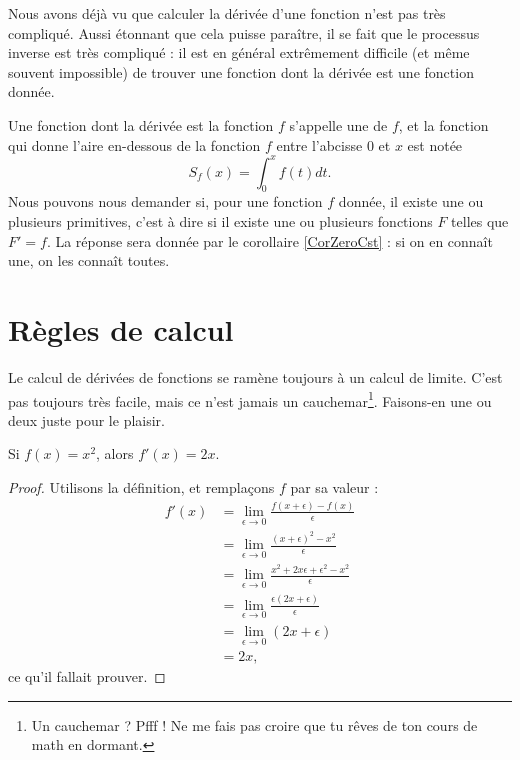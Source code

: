 \documentclass{article}
\begin{document}
Nous avons déjà vu que calculer la dérivée d'une fonction n'est pas très compliqué. Aussi étonnant que cela puisse paraître, il se fait que le processus inverse est très compliqué : il est en général extrêmement difficile (et même souvent impossible) de trouver une fonction dont la dérivée est une fonction donnée.

Une fonction dont la dérivée est la fonction $f$ s'appelle une  de $f$, et la fonction qui donne l'aire en-dessous de la fonction $f$ entre l'abcisse $0$ et $x$ est notée
\begin{equation}
	S_f(x)=\int_0^xf(t)dt.
\end{equation}
Nous pouvons nous demander si, pour une fonction $f$ donnée, il existe une ou plusieurs primitives, c'est à dire si il existe une ou plusieurs fonctions $F$ telles que $F'=f$. La réponse sera donnée par le corollaire \ref{CorZeroCst} : si on en connaît une, on les connaît toutes. 

					\section{Règles de calcul}

Le calcul de dérivées de fonctions se ramène toujours à un calcul de limite. C'est pas toujours très facile, mais ce n'est jamais un cauchemar\footnote{Un cauchemar ? Pfff ! Ne me fais pas croire que tu rêves de ton cours de math en dormant.}. Faisons-en une ou deux juste pour le plaisir.

\begin{lemma}			\label{LemDeccCarr}
	Si $f(x)=x^2$, alors $f'(x)=2x$.
\end{lemma}

\begin{proof}
	Utilisons la définition, et remplaçons $f$ par sa valeur :
	\begin{subequations}
		\begin{align}
			f'(x)	&=\lim_{\epsilon\to 0}\frac{ f(x+\epsilon)-f(x) }{ \epsilon }\\
				&=\lim_{\epsilon\to 0}\frac{ (x+\epsilon)^2-x^2 }{ \epsilon }\\
				&=\lim_{\epsilon\to 0}\frac{ x^2+2x\epsilon+\epsilon^2-x^2 }{ \epsilon }\\
				&=\lim_{\epsilon\to 0}\frac{\epsilon(2x+\epsilon)}{ \epsilon }\\
				&=\lim_{\epsilon\to 0}(2x+\epsilon)\\
				&=2x,
		\end{align}
	\end{subequations}
	ce qu'il fallait prouver.
\end{proof}
\end{document}
